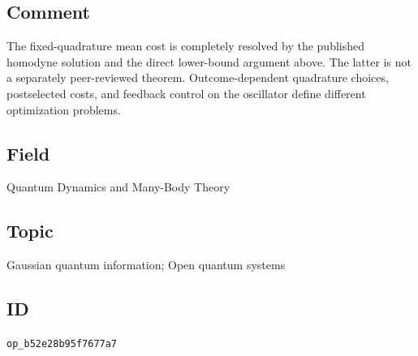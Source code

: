 \subsection*{Comment}

The fixed-quadrature mean cost is completely resolved by the published homodyne solution and the direct lower-bound argument above. The latter is not a separately peer-reviewed theorem. Outcome-dependent quadrature choices, postselected costs, and feedback control on the oscillator define different optimization problems.

\subsection*{Field}

Quantum Dynamics and Many-Body Theory

\subsection*{Topic}

Gaussian quantum information; Open quantum systems

\subsection*{ID}

\texttt{op\_b52e28b95f7677a7}
